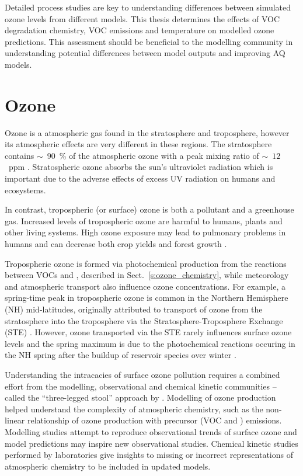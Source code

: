 Detailed process studies are key to understanding differences between simulated ozone levels from different models.
This thesis determines the effects of VOC degradation chemistry, VOC emissions and temperature on modelled ozone predictions.
This assessment should be beneficial to the modelling community in understanding potential differences between model outputs and improving AQ models.

\section{Ozone} \label{s:ozone}
Ozone is a atmospheric gas found in the stratosphere and troposphere, however its atmospheric effects are very different in these regions.
The stratosphere contains $\sim$~90~\% of the atmospheric ozone with a peak mixing ratio of $\sim$~$12$~ppm \citep{Seinfeld:2006}.
Stratospheric ozone absorbs the sun's ultraviolet radiation which is important due to the adverse effects of excess UV radiation on humans and ecosystems.

In contrast, tropospheric (or surface) ozone is both a pollutant and a greenhouse gas. 
Increased levels of tropospheric ozone are harmful to humans, plants and other living systems. 
High ozone exposure may lead to pulmonary problems in humans and can decrease both crop yields and forest growth \citep{WMO:2010}. 

Tropospheric ozone is formed via photochemical production from the reactions between VOCs and , described in Sect.~\ref{s:ozone_chemistry}, while meteorology and atmospheric transport also influence ozone concentrations.
For example, a spring-time peak in tropospheric ozone is common in the Northern Hemisphere (NH) mid-latitudes, originally attributed to transport of ozone from the stratosphere into the troposphere via the Stratosphere-Troposphere Exchange (STE) \citep{Monks:2000}.
However, ozone transported via the STE rarely influences surface ozone levels \citep{Lelieveld:2000} and the spring maximum is due to the photochemical reactions occuring in the NH spring after the buildup of reservoir species over winter \citep{Penkett:1986}.

Understanding the intracacies of surface ozone pollution requires a combined effort from the modelling, observational and chemical kinetic communities -- called the ``three-legged stool'' approach by \citet{Abbatt:2014}.
Modelling of ozone production helped understand the complexity of atmospheric chemistry, such as the non-linear relationship of ozone production with precursor (VOC and ) emissions.
Modelling studies attempt to reproduce observational trends of surface ozone and model predictions may inspire new observational studies.
Chemical kinetic studies performed by laboratories give insights to missing or incorrect representations of atmospheric chemistry to be included in updated models.

